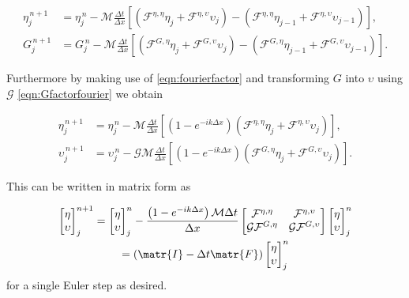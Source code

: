 \begin{align*}
\eta^{\,n + 1}_{j} &=  \eta^{\,n }_{j} - \mathcal{M} \frac{\Delta t}{\Delta x}  \left[ \left(\mathcal{F}^{\eta,\eta} \eta_{j}  + \mathcal{F}^{\eta,\upsilon} \upsilon_j \right) - \left(\mathcal{F}^{\eta,\eta} \eta_{j-1}  + \mathcal{F}^{\eta,\upsilon} \upsilon_{j-1} \right)  \right], \\
 G^{\,n + 1}_{j} &= G^{\,n }_{j} - \mathcal{M}\frac{\Delta t}{\Delta x}  \left[ \left(  \mathcal{F}^{G,\eta} \eta_{j}  + \mathcal{F}^{G,\upsilon} \upsilon_j \right) - \left(  \mathcal{F}^{G,\eta} \eta_{j-1}  + \mathcal{F}^{G,\upsilon} \upsilon_{j-1} \right) \right].
\end{align*}

	
Furthermore by making use of \eqref{eqn:fourierfactor} and transforming $G$ into $\upsilon$ using $\mathcal{G}$ \eqref{eqn:Gfactorfourier} we obtain
	
\begin{align*}
\eta^{\,n + 1}_{j} &=  \eta^{\,n }_{j} - \mathcal{M} \frac{\Delta t}{\Delta x}  \left[ \left(1 - e^{-ik\Delta x}\right)\left(\mathcal{F}^{\eta,\eta} \eta_{j}  + \mathcal{F}^{\eta,\upsilon} \upsilon_j \right)  \right], \\
\upsilon^{\,n + 1}_{j} &= \upsilon^{\,n }_{j} - {\mathcal{G}}{\mathcal{M}}\frac{\Delta t}{\Delta x}  \left[ \left(1 - e^{-ik\Delta x}\right)\left(  \mathcal{F}^{G,\eta} \eta_{j}  + \mathcal{F}^{G,\upsilon} \upsilon_j \right) \right].
\end{align*}


This can be written in matrix form as

\begin{multline}
\label{eqn:singleEvolveStep}
\begin{bmatrix}
\eta \\ \upsilon
\end{bmatrix}^{n+1}_j = \begin{bmatrix}
\eta \\ \upsilon
\end{bmatrix}^{n}_j - \frac{\left(1 - e^{-ik\Delta x}\right)\mathcal{M} \Delta t}{ \Delta x}\begin{bmatrix}
\mathcal{F}^{\eta,\eta} & \mathcal{F}^{\eta,\upsilon} \\ \mathcal{G}\mathcal{F}^{G,\eta} & \mathcal{G}\mathcal{F}^{G,\upsilon} 
\end{bmatrix}\begin{bmatrix}
\eta \\ \upsilon
\end{bmatrix}^{n}_j \\= \left(\matr{I}  - \Delta t \matr{F} \right) \begin{bmatrix}
\eta \\ \upsilon
\end{bmatrix}^{n}_j
\end{multline}
for a single Euler step as desired.

